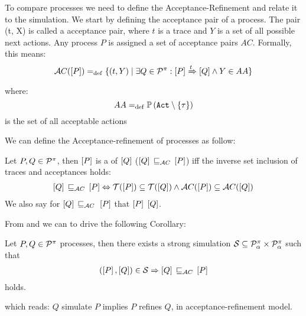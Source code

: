 To compare \picalc{} processes we need to define the Acceptance-Refinement and relate it to the simulation. We start by defining the acceptance pair of a process.
The pair (t, X) is called a acceptance pair, where $t$ is a trace and $Y$ is a set of all possible next actions. Any process
$P$ is assigned a set of acceptance pairs $AC$. Formally, this means:
\begin{align}
    \accepatances[P] \define \{(t,Y) \mid \exists Q\in\procs: \ec{P} \bigstep{t} \ec{Q}\wedge Y\in AA\}
\label{failure}
\end{align}
where: \[AA \define \pom{\actions\setminus\set{\tau}}\] is the set of all acceptable actions

We can define the Acceptance-refinement of \picalc{} processes as follow:

\begin{definition}
\label{def_failure_ref}
	Let $P,Q\in\mathcal P^{\pi}$, then $\left[P\right]$ is a  of $\left[Q\right]$ ($\ec{Q}\refiAC \ec{P}$) iff the inverse set inclusion of traces and acceptances holds:
\begin{align}
   \ec{Q} \refiAC \ec{P} \Leftrightarrow  \traces[P]\subseteq\traces[Q] \wedge \accepatances[P]\subseteq\accepatances[Q]
\end{align}
	We also say for $\ec{Q}\refiAC{}\ec{P}$ that $\left[P\right]$  $\left[Q\right]$.
\end{definition}

From  and  we can to drive the following Corollary: 

\begin{cor}
\label{cor_sim_acceptance_refinement}
Let $P,Q\in\mathcal P^{\pi}$ processes, then there exists a strong simulation $\mathcal{S}\subseteq\mathcal P^{\pi}_\alpha\times\mathcal P^{\pi}_\alpha$ such that
\begin{align}
    (\ec{P},\ec{Q})\in{}\simu  \Rightarrow \ec{Q} \refiAC \ec{P}
   \label{acceptance_model}
\end{align}
holds.
\end{cor}%
which reads:  $Q$ simulate $P$ implies $P$ refines $Q$, in acceptance-refinement model.


